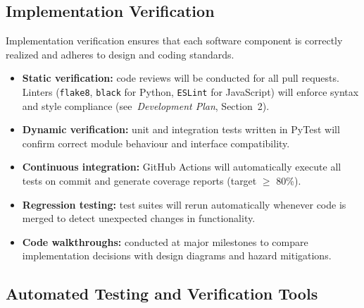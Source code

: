 \documentclass[12pt, titlepage]{article}
\begin{document}
\subsection{Implementation Verification}
\label{subsec:implementation-verification}


Implementation verification ensures that each software component is correctly
realized and adheres to design and coding standards.

\begin{itemize}
  \item \textbf{Static verification:} code reviews will be conducted for all pull
  requests. Linters (\texttt{flake8}, \texttt{black} for Python, \texttt{ESLint}
  for JavaScript) will enforce syntax and style compliance
  (see~\textit{Development Plan}, Section~2).

  \item \textbf{Dynamic verification:} unit and integration tests written in
  PyTest will confirm correct module behaviour and interface compatibility.

  \item \textbf{Continuous integration:} GitHub Actions will automatically
  execute all tests on commit and generate coverage reports (target $\geq$ 80\%).

  \item \textbf{Regression testing:} test suites will rerun automatically whenever
  code is merged to detect unexpected changes in functionality.

  \item \textbf{Code walkthroughs:} conducted at major milestones to compare
  implementation decisions with design diagrams and hazard mitigations.
\end{itemize}

\subsection{Automated Testing and Verification Tools}
\label{subsec:testing-tools}
\end{document}
